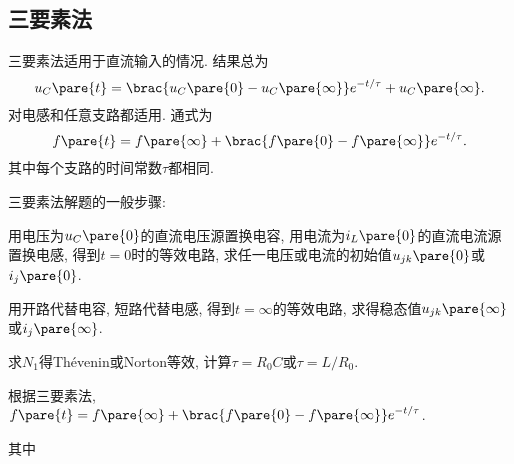 \documentclass{ctexart}
\begin{document}

\subsection{三要素法} %
\label{sub:三要素法}

三要素法适用于直流输入的情况. 结果总为
\[ u_C\pare{t} = \brac{u_C\pare{0} - u_C\pare{\infty}}e^{-t/\tau} + u_C\pare{\infty}. \]
对电感和任意支路都适用. 通式为
\[ f\pare{t} = f\pare{\infty} + \brac{f\pare{0} - f\pare{\infty}} e^{-t/\tau}. \]
其中每个支路的时间常数$\tau$都相同.
\par
三要素法解题的一般步骤:
\begin{cenum}
    \item 用电压为$u_C\pare{0}$的直流电压源置换电容, 用电流为$i_L\pare{0}$的直流电流源置换电感, 得到$t=0$时的等效电路, 求任一电压或电流的初始值$u_{jk}\pare{0}$或$i_j\pare{0}$.
    \item 用开路代替电容, 短路代替电感, 得到$t=\infty$的等效电路, 求得稳态值$u_{jk}\pare{\infty}$或$i_j\pare{\infty}$.
    \item 求$N_1$得Th\'evenin或Norton等效, 计算$\tau = R_0C$或$\tau=L/R_0$.
    \item 根据三要素法, $\displaystyle f\pare{t} = f\pare{\infty} + \brac{f\pare{0} - f\pare{\infty}} e^{-t/\tau}$.
\end{cenum}
其中
\end{document}
